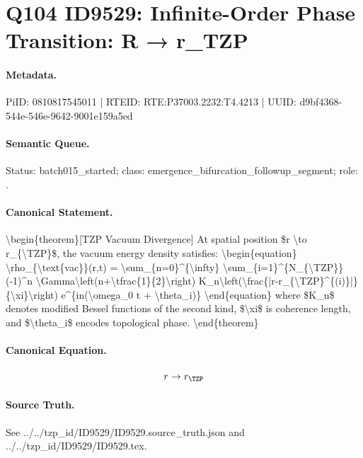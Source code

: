 \section*{Q104 ID9529: Infinite-Order Phase Transition: R → r\_TZP}
\paragraph{Metadata.}
PiID: 0810817545011 | RTEID: RTE:P37003.2232:T4.4213 | UUID: d9bf4368-544e-546e-9642-9001e159a5ed

\paragraph{Semantic Queue.}
Status: batch015\_started; class: emergence\_bifurcation\_followup\_segment; role: .

\paragraph{Canonical Statement.}
\textbackslash{}begin\{theorem\}[TZP Vacuum Divergence] At spatial position \$r \textbackslash{}to r\_\{\textbackslash{}TZP\}\$, the vacuum energy density satisfies: \textbackslash{}begin\{equation\} \textbackslash{}rho\_\{\textbackslash{}text\{vac\}\}(r,t) = \textbackslash{}sum\_\{n=0\}\textasciicircum{}\{\textbackslash{}infty\} \textbackslash{}sum\_\{i=1\}\textasciicircum{}\{N\_\{\textbackslash{}TZP\}\} (-1)\textasciicircum{}n \textbackslash{}Gamma\textbackslash{}left(n+\textbackslash{}tfrac\{1\}\{2\}\textbackslash{}right) K\_n\textbackslash{}left(\textbackslash{}frac\{|r-r\_\{\textbackslash{}TZP\}\textasciicircum{}\{(i)\}|\}\{\textbackslash{}xi\}\textbackslash{}right) e\textasciicircum{}\{in(\textbackslash{}omega\_0 t + \textbackslash{}theta\_i)\} \textbackslash{}end\{equation\} where \$K\_n\$ denotes modified Bessel functions of the second kind, \$\textbackslash{}xi\$ is coherence length, and \$\textbackslash{}theta\_i\$ encodes topological phase. \textbackslash{}end\{theorem\}

\paragraph{Canonical Equation.}
\[
r \to r_{\TZP}
\]

\paragraph{Source Truth.}
See ../../tzp\_id/ID9529/ID9529.source\_truth.json and ../../tzp\_id/ID9529/ID9529.tex.
